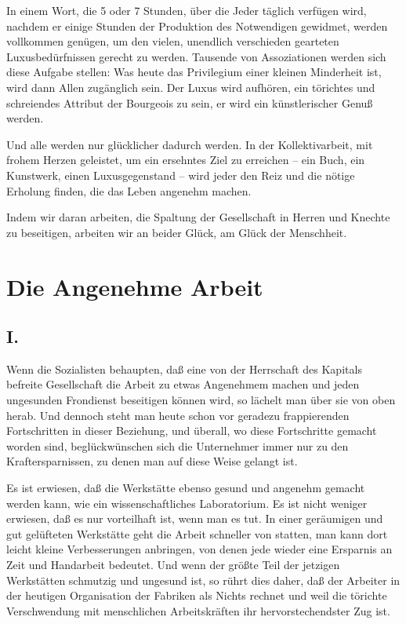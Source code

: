 \documentclass{scrbook}
\begin{document}
In einem Wort, die 5 oder 7 Stunden, über die Jeder täglich verfügen wird, nachdem er einige Stunden der Produktion des Notwendigen gewidmet, werden vollkommen genügen, um den vielen, unendlich verschieden gearteten Luxusbedürfnissen gerecht zu werden. Tausende von Assoziationen werden sich diese Aufgabe stellen: Was heute das Privilegium einer kleinen Minderheit ist, wird dann Allen zugänglich sein. Der Luxus wird aufhören, ein törichtes und schreiendes Attribut der Bourgeois zu sein, er wird ein künstlerischer Genuß werden.

Und alle werden nur glücklicher dadurch werden. In der Kollektivarbeit, mit frohem Herzen geleistet, um ein ersehntes Ziel zu erreichen – ein Buch, ein Kunstwerk, einen Luxusgegenstand – wird jeder den Reiz und die nötige Erholung finden, die das Leben angenehm machen.

Indem wir daran arbeiten, die Spaltung der Gesellschaft in Herren und Knechte zu beseitigen, arbeiten wir an beider Glück, am Glück der Menschheit.

\chapter{Die Angenehme Arbeit}
\section*{I.}

Wenn die Sozialisten behaupten, daß eine von der Herrschaft des Kapitals befreite Gesellschaft die Arbeit zu etwas Angenehmem machen und jeden ungesunden Frondienst beseitigen können wird, so lächelt man über sie von oben herab. Und dennoch steht man heute schon vor geradezu frappierenden Fortschritten in dieser Beziehung, und überall, wo diese Fortschritte gemacht worden sind, beglückwünschen sich die Unternehmer immer nur zu den Kraftersparnissen, zu denen man auf diese Weise gelangt ist.

Es ist erwiesen, daß die Werkstätte ebenso gesund und angenehm gemacht werden kann, wie ein wissenschaftliches Laboratorium. Es ist nicht weniger erwiesen, daß es nur vorteilhaft ist, wenn man es tut. In einer geräumigen und gut gelüfteten Werkstätte geht die Arbeit schneller von statten, man kann dort leicht kleine Verbesserungen anbringen, von denen jede wieder eine Ersparnis an Zeit und Handarbeit bedeutet. Und wenn der größte Teil der jetzigen Werkstätten schmutzig und ungesund ist, so rührt dies daher, daß der Arbeiter in der heutigen Organisation der Fabriken als Nichts rechnet und weil die törichte Verschwendung mit menschlichen Arbeitskräften ihr hervorstechendster Zug ist.
\end{document}
